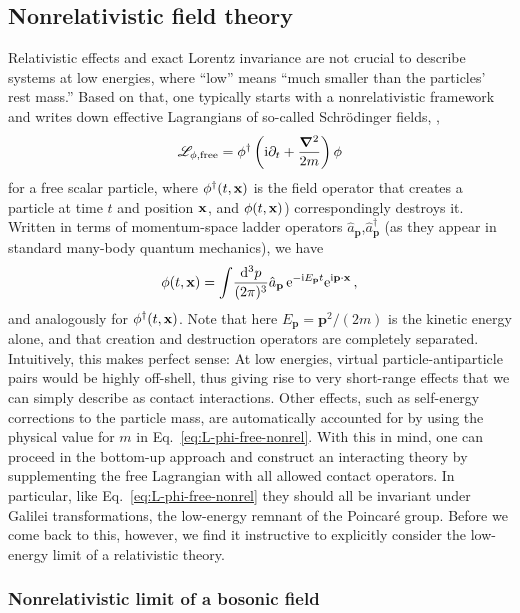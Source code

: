 \subsection{Nonrelativistic field theory}

Relativistic effects and exact Lorentz invariance are not crucial to describe 
systems at low energies, where ``low'' means ``much smaller than the particles' 
rest mass.''  Based on that, one typically starts with a nonrelativistic 
framework and writes down effective Lagrangians of so-called Schr\"odinger 
fields, \eg,
%
\begin{equation}
 \LL_{\phi,\text{free}}
 = \phi^\dagger \left(\ii\partial_t + \frac{\Laplace}{2m}\right)\phi
\label{eq:L-phi-free-nonrel}
\end{equation}
%
for a free scalar particle, where $\phi^\dagger(t,\mathbf{x})$ is the field operator 
that creates a particle at time $t$ and position $\mathbf{x}$, and $\phi(t,\mathbf{x})$)
correspondingly destroys it.  Written in terms of momentum-space ladder 
operators $\hat{a}_{\mathbf{p}}$,$\hat{a}^\dagger_{\mathbf{p}}$ (as they appear in standard 
many-body quantum mechanics), we have
%
\begin{equation}
 \phi(t,\mathbf{x})
 = \int\!\frac{\mathrm{d}^3p}{(2\pi)^3} \hat{a}_{\mathbf{p}} \,\mathrm{e}^{-\mathrm{i} E_{\mathbf{p}} t} 
 \mathrm{e}^{\mathrm{i}{\mathbf{p}}\cdot\mathbf{x}} \,,
\end{equation}
%
and analogously for $\phi^\dagger(t,\mathbf{x})$.  Note that here $E_{\mathbf{p}} = 
{\mathbf{p}}^2/(2m)$ is the kinetic energy alone, and that creation and destruction 
operators are completely separated.  Intuitively, this makes perfect sense: 
At low energies, virtual particle-antiparticle pairs would be highly 
off-shell, thus giving rise to very short-range effects that we can 
simply describe as contact interactions.  Other effects, such as self-energy 
corrections to the particle mass, are automatically accounted for by using the 
physical value for $m$ in Eq.~\eqref{eq:L-phi-free-nonrel}.  With this in mind, 
one can proceed in the bottom-up approach and construct an interacting theory 
by supplementing the free Lagrangian with all allowed contact operators.  In 
particular, like Eq.~\eqref{eq:L-phi-free-nonrel} they should all be invariant 
under Galilei transformations, the low-energy remnant of the Poincar{\'e} 
group.  Before we come back to this, however, we find it instructive to 
explicitly consider the low-energy limit of a relativistic theory.

\subsubsection{Nonrelativistic limit of a bosonic field}
\label{sec:EFT-NonRelBos}

